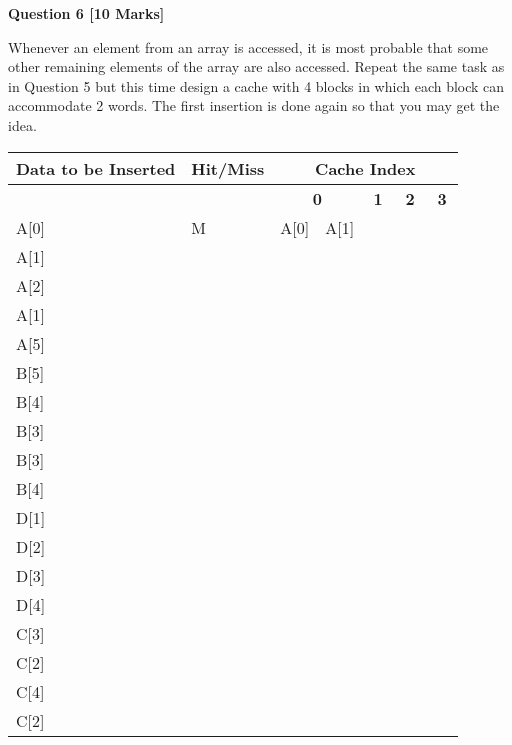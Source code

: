 \documentclass[addpoints]{exam}
\begin{document}
\begin{sloppypar}
\begin{questions}
\begin{solution}
    \end{solution}

    \question[10]
    \begin{center}
        \textbf{Question 6 [10 Marks]}
    \end{center}
    Whenever an element from an array is accessed, it is most probable that some other remaining elements of the array are also accessed. Repeat the same task as in Question 5 but this time design a cache with 4 blocks in which each block can accommodate 2 words. The first insertion is done again so that you may get the idea.

    \begin{tabular}{|m{15mm} | m{17mm} | m{8.5mm} |m{8.5mm} |m{8.5mm} |m{8.5mm} |m{8.5mm} |m{8.5mm} |m{8.5mm} |m{8.5mm} |}
        \hline
        \raggedright\textbf{Data to \hspace*{3.5mm} be Inserted} &\raggedright \textbf{Hit/Miss} & \multicolumn{8}{|c|}{\textbf{Cache Index}} \\ \hline 
        & & \multicolumn{2}{|c|}{\textbf{0}} & \multicolumn{2}{|c|}{\textbf{1}} & \multicolumn{2}{|c|}{\textbf{2}} & \multicolumn{2}{|c|}{\textbf{3}} \\ \hline
        A[0] & M & A[0] & A[1] & & & & & & \\ \hline
        A[1] & & & & & & & & &\\ \hline
        A[2] & & & & & & & & &\\ \hline
        A[1] & & & & & & & & &\\ \hline
        A[5] & & & & & & & & &\\ \hline
        B[5] & & & & & & & & &\\ \hline
        B[4] & & & & & & & & &\\ \hline
        B[3] & & & & & & & & &\\ \hline
        B[3] & & & & & & & & &\\ \hline
        B[4] & & & & & & & & &\\ \hline
        D[1] & & & & & & & & &\\ \hline
        D[2] & & & & & & & & &\\ \hline
        D[3] & & & & & & & & &\\ \hline
        D[4] & & & & & & & & &\\ \hline
        C[3] & & & & & & & & &\\ \hline
        C[2] & & & & & & & & &\\ \hline
        C[4] & & & & & & & & &\\ \hline
        C[2] & & & & & & & & &\\ \hline
    \end{tabular}


\end{questions}
\end{sloppypar}
\end{document}
